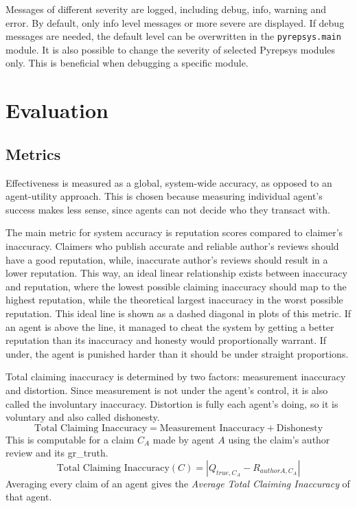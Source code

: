 \documentclass[%
    ]{\PathToTumTemplate/thesis/tum_thesis}
\begin{document}
Messages of different severity are logged, including debug, info, warning and error.
By default, only info level messages or more severe are displayed.
If debug messages are needed, the default level can be overwritten in the \texttt{pyrepsys.main} module.
It is also possible to change the severity of selected Pyrepsys modules only.
This is beneficial when debugging a specific module.




\chapter{Evaluation} \label{chap:evaluation}


\section{Metrics}\label{sec:metrics}

Effectiveness is measured as a global, system-wide accuracy, as opposed to an agent-utility approach.
This is chosen because measuring individual agent's success makes less sense, since agents can not decide who they transact with.

The main metric for system accuracy is reputation scores compared to claimer's inaccuracy.
Claimers who publish accurate and reliable author's reviews should have a good reputation, while, inaccurate author's reviews should result in a lower reputation.
This way, an ideal linear relationship exists between inaccuracy and reputation, where the lowest possible claiming inaccuracy should map to the highest reputation, while the theoretical largest inaccuracy in the worst possible reputation.
This ideal line is shown as a dashed diagonal in plots of this metric.
If an agent is above the line, it managed to cheat the system by getting a better reputation than its inaccuracy and honesty would proportionally warrant.
If under, the agent is punished harder than it should be under straight proportions.

Total claiming inaccuracy is determined by two factors: measurement inaccuracy and distortion.
Since measurement is not under the agent's control, it is also called the involuntary inaccuracy.
Distortion is fully each agent's doing, so it is voluntary and also called dishonesty.
\begin{equation}
\text{Total Claiming Inaccuracy} = \text{Measurement Inaccuracy} + \text{Dishonesty}
\end{equation}
This is computable for a claim $C_A$ made by agent $A$ using the claim's author review and its \gls{gr_truth}.
\begin{equation}
\text{Total Claiming Inaccuracy}(C) = \left| Q_{true,C_{A}} - R_{authorA,C_{A}} \right|
\end{equation}
Averaging every claim of an agent gives the \emph{Average Total Claiming Inaccuracy} of that agent.
\end{document}
